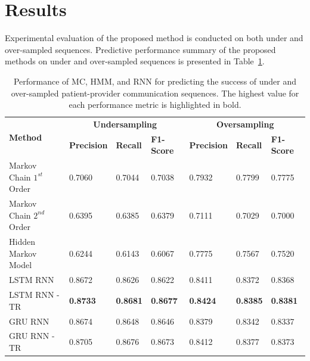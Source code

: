 \documentclass{amia_summit_2018}
\begin{document}
\section*{Results}
Experimental evaluation of the proposed method is conducted on both under and over-sampled sequences. Predictive performance summary of the proposed methods on under and over-sampled sequences is presented in Table~\ref{tab:result_under_over_sampled}.\\ 
\begin{table}[h]
\centering
\caption{Performance of MC, HMM, and RNN for predicting the success of under and over-sampled patient-provider communication sequences. The highest value for each performance metric is highlighted in bold.}
\label{tab:result_under_over_sampled}
  \begin{tabular}{|l|l|l|l|l|l|l|}
  \hline
   \multirow{2}{*}{\textbf{Method}} & \multicolumn{3}{|c|}{\textbf{Undersampling}} & \multicolumn{3}{|c|}{\textbf{Oversampling}} \\\cline{2-7}
   & \textbf{Precision}  & \textbf{Recall} & \textbf{F1-Score} & \textbf{Precision}  & \textbf{Recall} & \textbf{F1-Score}\\ \hline    
    
 Markov Chain $1^{st}$ Order & 0.7060 & 0.7044 & 0.7038 & 0.7932 & 0.7799 & 0.7775 \\ \hline
 Markov Chain $2^{nd}$ Order & 0.6395 & 0.6385 & 0.6379 & 0.7111 & 0.7029 & 0.7000\\ \hline
 Hidden Markov Model & 0.6244 & 0.6143 & 0.6067 & 0.7775 & 0.7567 & 0.7520\\ \hline
 LSTM RNN & 0.8672 & 0.8626 & 0.8622 & 0.8411 & 0.8372 & 0.8368\\ \hline
 LSTM RNN - TR & \textbf{0.8733} & \textbf{0.8681} & \textbf{0.8677} & \textbf{0.8424} & \textbf{0.8385} & \textbf{0.8381}\\ \hline
 GRU RNN & 0.8674 & 0.8648 & 0.8646 & 0.8379 & 0.8342 & 0.8337\\ \hline
 GRU RNN - TR & 0.8705 & 0.8676 & 0.8673 & 0.8412 & 0.8377 & 0.8373\\ \hline 
  \end{tabular}
\end{table}  
\end{document}
